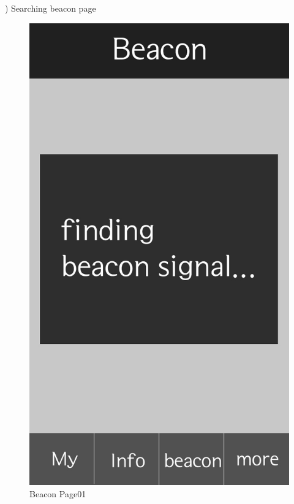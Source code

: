 \documentclass[conference]{IEEEtran}
\begin{document}
) Searching beacon page\\

\begin{figure}[htbp]
\begin{center}
    \includegraphics[scale=0.15]{img_findingSignal}
    \caption{Beacon Page01} 
\end{center}
\end{figure}
\end{document}
